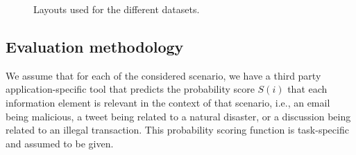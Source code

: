 \begin{figure}[t]
\begin{centering}
\par\end{centering}
\caption{Layouts used for the different datasets.}
\end{figure}

\subsection{Evaluation methodology}

We assume that for each of the considered scenario,  we have a third party application-specific tool that predicts the probability score $S(i)$ that each information element is relevant in the context of that scenario, i.e., an email being malicious, a tweet being related to a natural disaster, or a discussion being related to an illegal transaction. This probability scoring function is task-specific and assumed to be given. 

